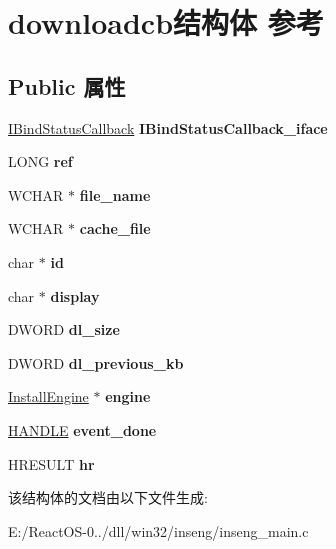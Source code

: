 \hypertarget{structdownloadcb}{}\section{downloadcb结构体 参考}
\label{structdownloadcb}
\subsection*{Public 属性}
\begin{DoxyCompactItemize}
\item 
\mbox{\label{structdownloadcb_ab022f11a4ee42e071e44a4c0420c79dd}} 
\hyperlink{interface_i_bind_status_callback}{I\+Bind\+Status\+Callback} {\bfseries I\+Bind\+Status\+Callback\+\_\+iface}
\item 
\mbox{\label{structdownloadcb_a14d18cea9fcd948b43d102ddfb9bf5e4}} 
L\+O\+NG {\bfseries ref}
\item 
\mbox{\label{structdownloadcb_a6f995d89f7518e8adfcff58e7eae7f51}} 
W\+C\+H\+AR $\ast$ {\bfseries file\+\_\+name}
\item 
\mbox{\label{structdownloadcb_aa699b1a12b69e702049dee2314b2b74b}} 
W\+C\+H\+AR $\ast$ {\bfseries cache\+\_\+file}
\item 
\mbox{\label{structdownloadcb_a49864e7350ba13ee86a52f5456da7268}} 
char $\ast$ {\bfseries id}
\item 
\mbox{\label{structdownloadcb_aeaac8216e6bbef7567af64bd5d091cfe}} 
char $\ast$ {\bfseries display}
\item 
\mbox{\label{structdownloadcb_a4cdcb2d141a250f70aca307de400454c}} 
D\+W\+O\+RD {\bfseries dl\+\_\+size}
\item 
\mbox{\label{structdownloadcb_a404d74040781e818bdcfa64768bcb33c}} 
D\+W\+O\+RD {\bfseries dl\+\_\+previous\+\_\+kb}
\item 
\mbox{\label{structdownloadcb_a124d3ae0701ba33e583c56ec3f99981e}} 
\hyperlink{struct_install_engine}{Install\+Engine} $\ast$ {\bfseries engine}
\item 
\mbox{\label{structdownloadcb_a483bf85217fe6f5335e04896c7d34868}} 
\hyperlink{interfacevoid}{H\+A\+N\+D\+LE} {\bfseries event\+\_\+done}
\item 
\mbox{\label{structdownloadcb_a1de364a2ce66098113023661d53df14f}} 
H\+R\+E\+S\+U\+LT {\bfseries hr}
\end{DoxyCompactItemize}


该结构体的文档由以下文件生成\+:\begin{DoxyCompactItemize}
\item 
E\+:/\+React\+O\+S-\/0../dll/win32/inseng/inseng\+\_\+main.\+c\end{DoxyCompactItemize}
